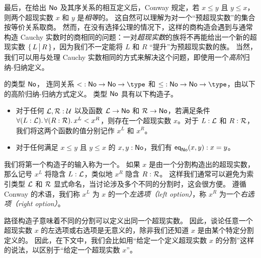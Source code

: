 最后，在给出 $\mathsf{No}$ 及其序关系的相互定义后，Conway 规定，若 $x\le y$ 且 $y\le x$，则两个超现实数 $x$ 和 $y$ 是\emph{相等}的。
这自然可以理解为对一个“预超现实数”的集合按等价关系取商。
然而，在没有选择公理的情况下，这样的商构造会遇到与通常构造 Cauchy 实数时的商相同的问题：一对\emph{超现实数}的族将不再能给出一个新的超现实数 $\{\,L\,\big|\,R\,\}$，因为我们不一定能将 $L$ 和 $R$ “提升”为预超现实数的族。
当然，我们可以用与处理 Cauchy 实数相同的方式来解决这个问题，即使用一个\emph{高阶}归纳-归纳定义。

\begin{defn}\label{defn:surreals}
  的类型 $\mathsf{No}$，
  连同关系 $\mathord<:\NO\to\NO\to\type$ 和 $\mathord\le:\NO\to\NO\to\type$，由以下的高阶归纳-归纳方式定义。
  类型 $\mathsf{No}$ 具有以下构造子。
  \begin{itemize}
  \item 对于任何 $\mathcal{L},\mathcal{R}:\mathcal{U}$ 以及函数 $\mathcal{L}\to \mathsf{No}$ 和 $\mathcal{R}\to \mathsf{No}$，若满足条件 $\fall{L:\LL}{R:\RR} x^L<x^R$，则存在一个超现实数 $x$。对于 $L:\mathcal{L}$ 和 $R:\mathcal{R}$，我们将这两个函数的值分别记作 $x^L$ 和 $x^R$。
  \item 对于任何满足 $x\le y$ 且 $y\le x$ 的 $x,y:\mathsf{No}$，我们有 $\mathsf{eq}_{\mathsf{No}}(x,y):x=y$。
  \end{itemize}
  我们将第一个构造子的输入称为一个。
  如果 $x$ 是由一个分割构造出的超现实数，那么记号 $x^L$ 将隐含 $L:\mathcal{L}$，类似地 $x^R$ 隐含 $R:\mathcal{R}$。
  这样我们通常可以避免为索引类型 $\mathcal{L}$ 和 $\mathcal{R}$ 显式命名，当讨论涉及多个不同的分割时，这会很方便。
  遵循 Conway 的术语，我们称 $x^L$ 为 $x$ 的一个\emph{左选项（left option）}，称 $x^R$ 为一个\emph{右选项（right option）}。

  路径构造子意味着不同的分割可以定义出同一个超现实数。
  因此，谈论任意一个超现实数 $x$ 的左选项或右选项是无意义的，除非我们还知道 $x$ 是由某个特定分割定义的。
  因此，在下文中，我们会比如用“给定一个定义超现实数 $x$ 的分割”这样的说法，以区别于“给定一个超现实数 $x$”。


\end{defn}
